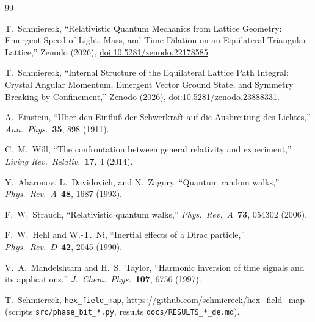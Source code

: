 \documentclass[twocolumn,showpacs,preprintnumbers,amsmath,amssymb]{revtex4-2}
\begin{document}
\begin{thebibliography}{99}

  T.~Schmiereck,
  ``Relativistic Quantum Mechanics from Lattice Geometry:
    Emergent Speed of Light, Mass, and Time Dilation on an Equilateral
    Triangular Lattice,''
  Zenodo (2026),
  \href{https://doi.org/10.5281/zenodo.22178585}{doi:10.5281/zenodo.22178585}.

  T.~Schmiereck,
  ``Internal Structure of the Equilateral Lattice Path Integral:
    Crystal Angular Momentum, Emergent Vector Ground State,
    and Symmetry Breaking by Confinement,''
  Zenodo (2026),
  \href{https://doi.org/10.5281/zenodo.23888331}{doi:10.5281/zenodo.23888331}.

  A.~Einstein,
  ``\"Uber den Einflu{\ss} der Schwerkraft auf die Ausbreitung des Lichtes,''
  \emph{Ann.\ Phys.}\ \textbf{35}, 898 (1911).

  C.~M.~Will,
  ``The confrontation between general relativity and experiment,''
  \emph{Living Rev.\ Relativ.}\ \textbf{17}, 4 (2014).

  Y.~Aharonov, L.~Davidovich, and N.~Zagury,
  ``Quantum random walks,''
  \emph{Phys.\ Rev.\ A}\ \textbf{48}, 1687 (1993).

  F.~W.~Strauch,
  ``Relativistic quantum walks,''
  \emph{Phys.\ Rev.\ A}\ \textbf{73}, 054302 (2006).

  F.~W.~Hehl and W.-T.~Ni,
  ``Inertial effects of a Dirac particle,''
  \emph{Phys.\ Rev.\ D}\ \textbf{42}, 2045 (1990).

  V.~A.~Mandelshtam and H.~S.~Taylor,
  ``Harmonic inversion of time signals and its applications,''
  \emph{J.\ Chem.\ Phys.}\ \textbf{107}, 6756 (1997).

  T.~Schmiereck, \texttt{hex\_field\_map},
  \url{https://github.com/schmiereck/hex_field_map}
  (scripts \texttt{src/phase\_bit\_*.py}, results \texttt{docs/RESULTS\_*\_de.md}).

\end{thebibliography}
\end{document}
